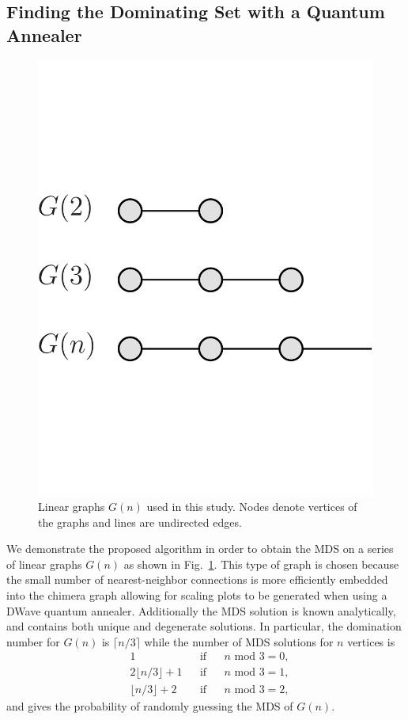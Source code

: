 \documentclass[prd,twocolumn,tightenlines,preprintnumbers,showpacs,superscriptaddress,notitlepage,nofootinbib,eqsecnum,floatfix,longbibliography]{revtex4}
\begin{document}
\subsection{Finding the Dominating Set with a Quantum Annealer}
\label{sec:discussion:qa}

\begin{figure}[b]
    \centering
        \includegraphics[width=0.5\columnwidth]{./figures/linear_crop.pdf}
    \caption{Linear graphs $G(n)$ used in this study.
Nodes denote vertices of the graphs and lines are undirected edges.}
    \label{fig:linear}
\end{figure}

We demonstrate the proposed algorithm in order to obtain the MDS on a series of linear graphs $G(n)$ as shown in Fig.~\ref{fig:linear}.
This type of graph is chosen because the small number of nearest-neighbor connections is more efficiently embedded into the chimera graph allowing for scaling plots to be generated when using a DWave quantum annealer.
Additionally the MDS solution is known analytically, and contains both unique and degenerate solutions.
In particular, the domination number for $G(n)$ is $\lceil n/3 \rceil$ while the number of MDS solutions for $n$ vertices is
\begin{align}
    &1 &&\textrm{if} && n\textrm{ mod }3=0,\nonumber \\
    &2\lfloor n/3 \rfloor + 1 && \textrm{if}&& n\textrm{ mod }3=1,\nonumber \\
    &\lfloor n/3 \rfloor + 2 && \textrm{if} && n \textrm{ mod }3 = 2,
\end{align}
and gives the probability of randomly guessing the MDS of $G(n)$.
\end{document}
